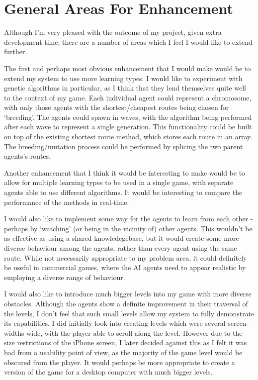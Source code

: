 \documentclass[a4paper,oneside]{report}
\begin{document}
\section{General Areas For Enhancement}

Although I'm very pleased with the outcome of my project, given extra development time, there are a number of areas which I feel I would like to extend further.

The first and perhaps most obvious enhancement that I would make would be to extend my system to use more learning types. I would like to experiment with genetic algorithms in particular, as I think that they lend themselves quite well to the context of my game. Each individual agent could represent a chromosome, with only those agents with the shortest/cheapest routes being chosen for `breeding'. The agents could spawn in waves, with the algorithm being performed after each wave to represent a single generation. This functionality could be built on top of the existing shortest route method, which stores each route in an array. The breeding/mutation process could be performed by splicing the two parent agents's routes.

Another enhancement that I think it would be interesting to make would be to allow for multiple learning types to be used in a single game, with separate agents able to use different algorithms. It would be interesting to compare the performance of the methods in real-time. 

I would also like to implement some way for the agents to learn from each other - perhaps by `watching' (or being in the vicinity of) other agents. This wouldn't be as effective as using a shared knowledegebase, but it would create some more diverse behaviour among the agents, rather than every agent using the same route. While not necessarily appropriate to my problem area, it could definitely be useful in commercial games, where the AI agents need to appear realistic by employing a diverse range of behaviour.

I would also like to introduce much bigger levels into my game with more diverse obstacles. Although the agents show a definite improvement in their traversal of the levels, I don't feel that such small levels allow my system to fully demonstrate its capabilities. I did initially look into creating levels which were several screen-widths wide, with the player able to scroll along the level. However due to the size restrictions of the iPhone screen, I later decided against this as I felt it was bad from a usability point of view, as the majority of the game level would be obscured from the player. It would perhaps be more appropriate to create a version of the game for a desktop computer with much bigger levels.
\end{document}
